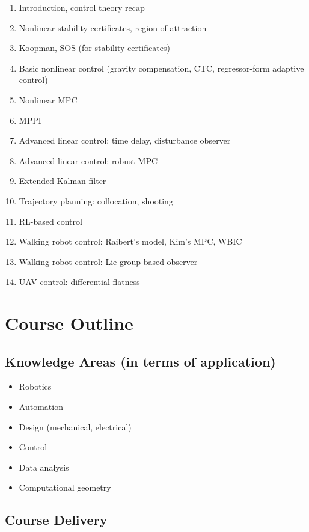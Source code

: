 \documentclass[11pt,a4paper]{article}
\begin{document}
\begin{enumerate}
	\item Introduction, control theory recap
	\item Nonlinear stability certificates, region of attraction
	\item Koopman, SOS (for stability certificates)
	\item Basic nonlinear control (gravity compensation, CTC, regressor-form adaptive control)
	\item Nonlinear MPC
	\item MPPI
	\item Advanced linear control: time delay, disturbance observer
	\item Advanced linear control: robust MPC
	\item Extended Kalman filter
	\item Trajectory planning: collocation, shooting
	\item RL-based control
	\item Walking robot control: Raibert’s model, Kim’s MPC, WBIC
	\item Walking robot control: Lie group-based observer
	\item UAV control: differential flatness
\end{enumerate}


\section{Course Outline}


\subsection{Knowledge Areas (in terms of application)}

\begin{itemize}
	\item Robotics
	\item Automation
	\item Design (mechanical, electrical)
	\item Control
	\item Data analysis
	\item Computational geometry
\end{itemize}

\subsection{Course Delivery}
\end{document}
